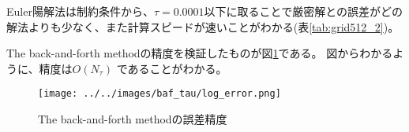Euler陽解法は制約条件から、$\tau = 0.0001$以下に取ることで厳密解との誤差がどの解法よりも少なく、また計算スピードが速いことがわかる(表\ref{tab:grid512_2})。





The back-and-forth methodの精度を検証したものが図\ref{img:error accuracy}である。
図からわかるように、精度は$O(N_\tau)$ であることがわかる。
\begin{figure}[htbp]
    \centering
    \texttt{[image: ../../images/baf\_tau/log\_error.png]}
    \caption{The back-and-forth methodの誤差精度}
    \label{img:error accuracy}
\end{figure}